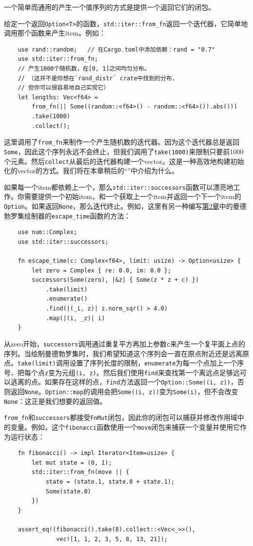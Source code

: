 一个简单而通用的产生一个值序列的方式是提供一个返回它们的闭包。

给定一个返回\texttt{Option<T>}的函数，\texttt{std::iter::from\_fn}返回一个迭代器，它简单地调用那个函数来产生item。例如：
\begin{verbatim}
    use rand::random;   // 在Cargo.toml中添加依赖：rand = "0.7"
    use std::iter::from_fn;
    // 产生1000个随机数，在[0, 1]之间均匀分布。
    // （这并不是你想在`rand_distr` crate中找到的分布，
    // 但你可以很容易地自己实现它）
    let lengths: Vec<f64> =
        from_fn(|| Some((random::<f64>() - random::<f64>()).abs()))
        .take(1000)
        .collect();
\end{verbatim}

这里调用了\texttt{from\_fn}来制作一个产生随机数的迭代器。因为这个迭代器总是返回\texttt{Some}，因此这个序列永远不会终止，但我们调用了\texttt{take(1000)}来限制只要前1000个元素。然后\texttt{collect}从最后的迭代器构建一个vector。这是一种高效地构建初始化的vector的方式。我们将在本章稍后的“”中介绍为什么。

如果每一个item都依赖上一个，那么\texttt{std::iter::successors}函数可以漂亮地工作。你需要提供一个初始item，和一个获取上一个item并返回一个下一个item的\texttt{Option}。如果返回\texttt{None}，那么迭代终止。例如，这里有另一种编写\hyperref[ch02]{第2章}中的曼德勃罗集绘制器的\texttt{escape\_time}函数的方法：
\begin{verbatim}
    use num::Complex;
    use std::iter::successors;

    fn escape_time(c: Complex<f64>, limit: usize) -> Option<usize> {
        let zero = Complex { re: 0.0, im: 0.0 };
        successors(Some(zero), |&z| { Some(z * z + c) })
            .take(limit)
            .enumerate()
            .find(|(_i, z)| z.norm_sqr() > 4.0)
            .map(|(i, _z)| i)
    }
\end{verbatim}

从zero开始，\texttt{successors}调用通过重复平方再加上参数\texttt{c}来产生一个复平面上点的序列。当绘制曼德勃罗集时，我们希望知道这个序列会一直在原点附近还是远离原点。\texttt{take(limit)}调用设置了序列长度的限制，\texttt{enumerate}为每一个点加上一个序号、把每个点\texttt{z}变为元组\texttt{(i, z)}。然后我们使用\texttt{find}来查找第一个离远点足够远可以逃离的点。如果存在这样的点，\texttt{find}方法返回一个\texttt{Option::Some((i, z))}，否则返回\texttt{None}。\texttt{Option::map}的调用会把\texttt{Some((i, z))}变为\texttt{Some(i)}，但不会改变\texttt{None}：这正是我们想要的返回值。

\texttt{from\_fn}和\texttt{successors}都接受\texttt{FnMut}闭包，因此你的闭包可以捕获并修改作用域中的变量。例如，这个\texttt{fibonacci}函数使用一个\texttt{move}闭包来捕获一个变量并使用它作为运行状态：
\begin{verbatim}
    fn fibonacci() -> impl Iterator<Item=usize> {
        let mut state = (0, 1);
        std::iter::from_fn(move || {
            state = (state.1, state.0 + state.1);
            Some(state.0)
        })
    }

    assert_eq!(fibonacci().take(8).collect::<Vec<_>>(),
               vec![1, 1, 2, 3, 5, 8, 13, 21]);
\end{verbatim}

